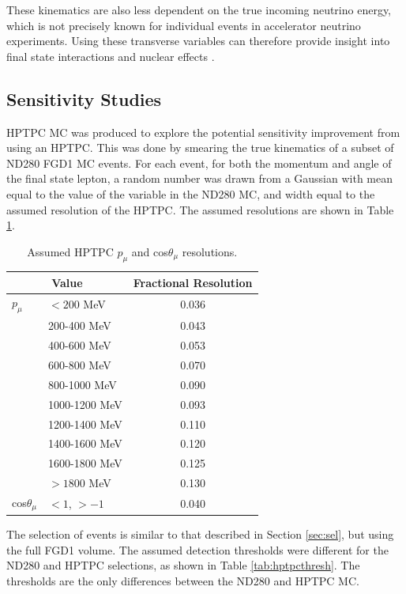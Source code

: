 These kinematics are also less dependent on the true incoming neutrino energy, which is not precisely known for individual events in accelerator neutrino experiments. Using these transverse variables can therefore provide insight into final state interactions and nuclear effects \cite{stv3}.

\subsection{Sensitivity Studies}

HPTPC MC was produced to explore the potential sensitivity improvement from using an HPTPC. This was done by smearing the true kinematics of a subset of ND280 FGD1 MC events. For each event, for both the momentum and angle of the final state lepton, a random number was drawn from a Gaussian with mean equal to the value of the variable in the ND280 MC, and width equal to the assumed resolution of the HPTPC. The assumed resolutions are shown in Table \ref{tab:hptpcres}.

\begin{center}
\begin{table}
\center
\begin{tabular}{l l||c}
\hline \hline
\multicolumn{2}{c||}{\textbf{Value}} & \textbf{Fractional Resolution}\\
\hline
\hline
$p_{\mu}$ & $<200$ MeV & 0.036 \\
 & 200-400 MeV & 0.043 \\
 & 400-600 MeV & 0.053 \\
 & 600-800 MeV & 0.070 \\
 & 800-1000 MeV & 0.090 \\
 & 1000-1200 MeV & 0.093 \\
 & 1200-1400 MeV & 0.110 \\
 & 1400-1600 MeV & 0.120 \\
 & 1600-1800 MeV & 0.125 \\
 & $>1800$ MeV & 0.130 \\  
\hline
cos$\theta_{\mu}$ & $<1$, $>-1$ & 0.040 \\
\hline \hline
\end{tabular}
\caption{Assumed HPTPC $p_{\mu}$ and cos$\theta_{\mu}$ resolutions.}
\label{tab:hptpcres}
\end{table}
\end{center}

The selection of events is similar to that described in Section \ref{sec:sel}, but using the full FGD1 volume. The assumed detection thresholds were different for the ND280 and HPTPC selections, as shown in Table \ref{tab:hptpcthresh}. The thresholds are the only differences between the ND280 and HPTPC MC.

